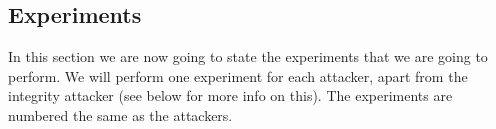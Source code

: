 \subsection{Experiments}
\label{methodology_experiments}

In this section we are now going to state the experiments that we are going to perform. We will perform one experiment for each attacker, apart from the integrity attacker (see below for more info on this). The experiments are numbered the same as the attackers.

